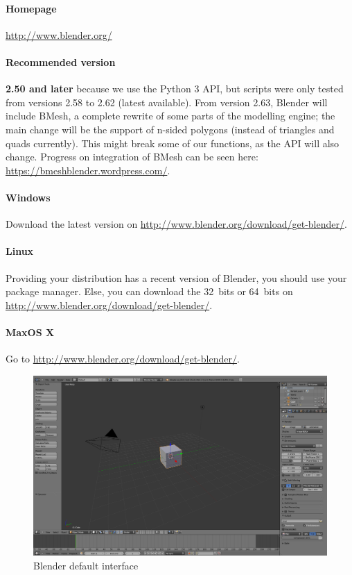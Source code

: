 \documentclass{article}
\begin{document}
	\paragraph{Homepage} \url{http://www.blender.org/}

	\paragraph{Recommended version} \textbf{2.50 and later} because we use the Python 3 API, but scripts were only tested from versions 2.58 to 2.62 (latest available). From version 2.63, Blender will include BMesh, a complete rewrite of some parts of the modelling engine; the main change will be the support of n-sided polygons (instead of triangles and quads currently). This might break some of our functions, as the API will also change. Progress on integration of BMesh can be seen here: \url{https://bmeshblender.wordpress.com/}.

	\paragraph{Windows} Download the latest version on \url{http://www.blender.org/download/get-blender/}.

	\paragraph{Linux} Providing your distribution has a recent version of Blender, you should use your package manager. Else, you can download the 32~bits or 64~bits on \url{http://www.blender.org/download/get-blender/}.

	\paragraph{MaxOS X} Go to \url{http://www.blender.org/download/get-blender/}. %

	\begin{figure}[h!]
		\centering
		\includegraphics[width=\linewidth]{blender.png}
		\caption{Blender default interface}
	\end{figure}
\end{document}

